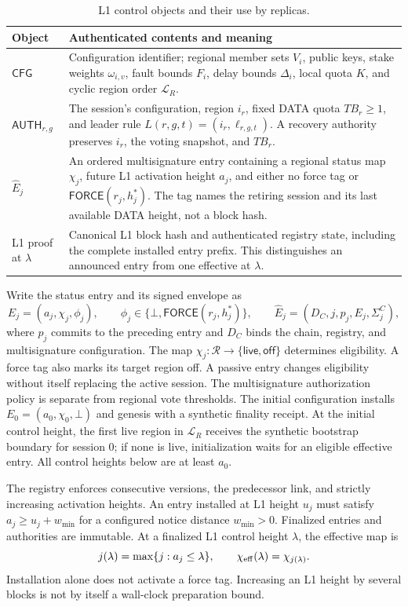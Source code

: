 \documentclass[11pt,a4paper]{article}
\newcommand{\tagg}[1]{\ensuremath{\mathsf{#1}}}
\begin{document}
\begin{table}[htbp]\centering\small
\caption{L1 control objects and their use by replicas.}
\label{tab:l1}
\begin{tabularx}{\linewidth}{@{}p{.25\linewidth}Y@{}}
\toprule
Object & Authenticated contents and meaning\\
\midrule
$\tagg{CFG}$ & Configuration identifier; regional member sets $V_i$, public
keys, stake weights $\omega_{i,v}$, fault bounds $F_i$, delay bounds
$\Delta_i$, local quota $K$, and cyclic region order $\mathcal L_R$.\\
$\tagg{AUTH}_{r,g}$ & The session's configuration, region $i_r$, fixed
DATA quota $TB_r\ge1$, and leader rule
$L(r,g,t)=(i_r,\ell_{r,g,t})$. A recovery authority preserves
$i_r$, the voting snapshot, and $TB_r$.\\
$\widehat E_j$ & An ordered multisignature entry containing a regional
status map $\chi_j$, future L1 activation height $a_j$, and either no
force tag or $\tagg{FORCE}(r_j,h_j^*)$. The tag names the retiring
session and its last available DATA height, not a block hash.\\
L1 proof at $\lambda$ & Canonical L1 block hash and authenticated registry
state, including the complete installed entry prefix. This distinguishes
an announced entry from one effective at $\lambda$.\\
\bottomrule
\end{tabularx}
\end{table}

Write the status entry and its signed envelope as
\[
 E_j=(a_j,\chi_j,\phi_j),\qquad
 \phi_j\in\{\bot,\tagg{FORCE}(r_j,h_j^*)\},\qquad
 \widehat E_j=(D_C,j,p_j,E_j,\Sigma_j^C),
\]
where $p_j$ commits to the preceding entry and $D_C$ binds the chain,
registry, and multisignature configuration. The map
$\chi_j:\mathcal R\to\{\tagg{live},\tagg{off}\}$ determines eligibility.
A force tag also marks its target region off. A passive entry changes
eligibility without itself replacing the active session. The multisignature
authorization policy is separate from regional vote thresholds.
The initial configuration installs $E_0=(a_0,\chi_0,\bot)$ and genesis
with a synthetic finality receipt. At the initial control height, the
first live region in $\mathcal L_R$ receives the synthetic bootstrap
boundary for session $0$; if none is live, initialization waits for an
eligible effective entry. All control heights below are at least $a_0$.

The registry enforces consecutive versions, the predecessor link, and
strictly increasing activation heights. An entry installed at L1 height
$u_j$ must satisfy $a_j\ge u_j+w_{\min}$ for a configured notice distance
$w_{\min}>0$. Finalized entries and authorities are immutable. At a
finalized L1 control height $\lambda$, the effective map is
\[
 j(\lambda)=\max\{j:a_j\le\lambda\},\qquad
 \chi_{\rm eff}(\lambda)=\chi_{j(\lambda)}.
\]
Installation alone does not activate a force tag. Increasing an L1 height
by several blocks is not by itself a wall-clock preparation bound.
\end{document}
